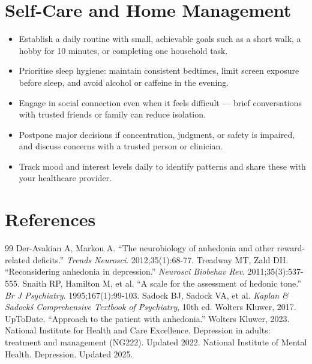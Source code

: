 \section*{Self-Care and Home Management}
\begin{itemize}
 \item Establish a daily routine with small, achievable goals such as a short walk, a hobby for 10 minutes, or completing one household task.
 \item Prioritise sleep hygiene: maintain consistent bedtimes, limit screen exposure before sleep, and avoid alcohol or caffeine in the evening.
 \item Engage in social connection even when it feels difficult — brief conversations with trusted friends or family can reduce isolation.
 \item Postpone major decisions if concentration, judgment, or safety is impaired, and discuss concerns with a trusted person or clinician.
 \item Track mood and interest levels daily to identify patterns and share these with your healthcare provider.
\end{itemize}

\section*{References}
\begin{thebibliography}{99}
 Der-Avakian A, Markou A. ``The neurobiology of anhedonia and other reward-related deficits.'' \textit{Trends Neurosci}. 2012;35(1):68-77.
 Treadway MT, Zald DH. ``Reconsidering anhedonia in depression.'' \textit{Neurosci Biobehav Rev}. 2011;35(3):537-555.
 Snaith RP, Hamilton M, et al. ``A scale for the assessment of hedonic tone.'' \textit{Br J Psychiatry}. 1995;167(1):99-103.
 Sadock BJ, Sadock VA, et al. \textit{Kaplan \& Sadock\'s Comprehensive Textbook of Psychiatry}, 10th ed. Wolters Kluwer, 2017.
 UpToDate. ``Approach to the patient with anhedonia.'' Wolters Kluwer, 2023.
 National Institute for Health and Care Excellence. Depression in adults: treatment and management (NG222). Updated 2022.
 National Institute of Mental Health. Depression. Updated 2025.
\end{thebibliography}
